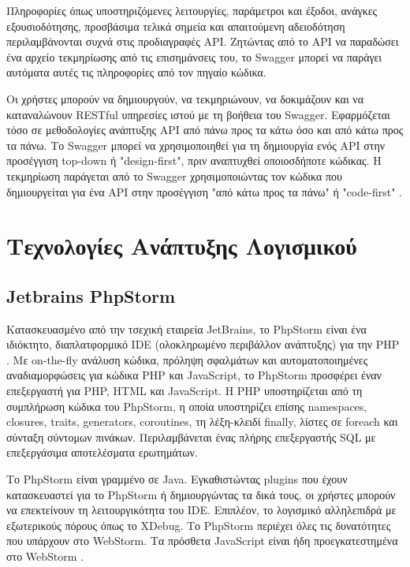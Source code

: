 Πληροφορίες όπως υποστηριζόμενες λειτουργίες, παράμετροι και έξοδοι, ανάγκες εξουσιοδότησης, προσβάσιμα τελικά σημεία και απαιτούμενη αδειοδότηση περιλαμβάνονται συχνά στις προδιαγραφές API. Ζητώντας από το API να παραδώσει ένα αρχείο τεκμηρίωσης από τις επισημάνσεις του, το Swagger μπορεί να παράγει αυτόματα αυτές τις πληροφορίες από τον πηγαίο κώδικα.

Οι χρήστες μπορούν να δημιουργούν, να τεκμηριώνουν, να δοκιμάζουν και να καταναλώνουν RESTful υπηρεσίες ιστού με τη βοήθεια του Swagger. Εφαρμόζεται τόσο σε μεθοδολογίες ανάπτυξης API από πάνω προς τα κάτω όσο και από κάτω προς τα πάνω. Το Swagger μπορεί να χρησιμοποιηθεί για τη δημιουργία ενός API στην προσέγγιση top-down ή "design-first", πριν αναπτυχθεί οποιοσδήποτε κώδικας. Η τεκμηρίωση παράγεται από το Swagger χρησιμοποιώντας τον κώδικα που δημιουργείται για ένα API στην προσέγγιση "από κάτω προς τα πάνω" ή "code-first" \cite{Swagger_2019}.

\section{Τεχνολογίες Ανάπτυξης Λογισμικού}

\subsection{Jetbrains PhpStorm}
Κατασκευασμένο από την τσεχική εταιρεία JetBrains, το PhpStorm είναι ένα ιδιόκτητο, διαπλατφορμικό IDE (ολοκληρωμένο περιβάλλον ανάπτυξης) για την PHP \cite{grigorev2014string}. Με on-the-fly ανάλυση κώδικα, πρόληψη σφαλμάτων και αυτοματοποιημένες αναδιαμορφώσεις για κώδικα PHP και JavaScript, το PhpStorm προσφέρει έναν επεξεργαστή για PHP, HTML και JavaScript. Η PHP υποστηρίζεται από τη συμπλήρωση κώδικα του PhpStorm, η οποία υποστηρίζει επίσης namespaces, closures, traits, generators, coroutines, τη λέξη-κλειδί finally, λίστες σε foreach και σύνταξη σύντομων πινάκων. Περιλαμβάνεται ένας πλήρης επεξεργαστής SQL με επεξεργάσιμα αποτελέσματα ερωτημάτων.

Το PhpStorm είναι γραμμένο σε Java. Εγκαθιστώντας plugins που έχουν κατασκευαστεί για το PhpStorm ή δημιουργώντας τα δικά τους, οι χρήστες μπορούν να επεκτείνουν τη λειτουργικότητα του IDE. Επιπλέον, το λογισμικό αλληλεπιδρά με εξωτερικούς πόρους όπως το XDebug. Το PhpStorm περιέχει όλες τις δυνατότητες που υπάρχουν στο WebStorm. Τα πρόσθετα JavaScript είναι ήδη προεγκατεστημένα στο WebStorm \cite{PhpStorm_JetBrains}.

